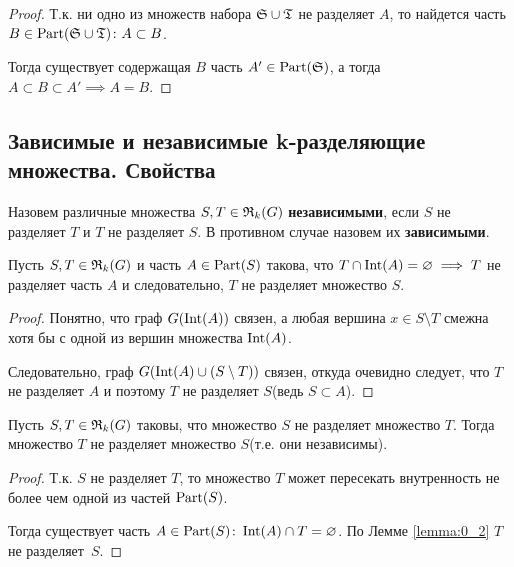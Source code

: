\begin{proof}
	Т.к. ни одно из множеств набора $\mathfrak{S} \cup \mathfrak{T}$ не разделяет  $A$, то найдется часть  $B \in \operatorname{Part}(\mathfrak{S} \cup \mathfrak{T}) \colon A \subset B$.

	Тогда существует содержащая  $B$ часть  $A' \in \operatorname{Part}(\mathfrak{S})$, а тогда  $A \subset B \subset A' \implies A = B$.
\end{proof}

\subsection{Зависимые и независимые k-разделяющие множества. Свойства}

\begin{df*}
	Назовем различные множества $S, T \in \mathfrak{R}_k(G)$ \textbf{независимыми}, если $S$ не разделяет $T$ и $T$ не разделяет $S$.
	В противном случае назовем их \textbf{зависимыми}.
\end{df*}

\begin{customlm}{0.2} \label{lemma:0_2}
	Пусть $S, T \in \mathfrak{R}_k(G)$ и часть  $A \in \operatorname{Part}(S)$ такова, что  $T \cap \operatorname{Int}(A) = \varnothing \implies T$ не разделяет часть  $A$ и следовательно,  $T$ не разделяет множество  $S$.
\end{customlm}

\begin{proof}
	Понятно, что граф $G(\operatorname{Int}(A))$ связен, а любая вершина  $x \in S \setminus T$ смежна хотя бы с одной из вершин множества  $\operatorname{Int}(A)$.

	Следовательно, граф  $G(\operatorname{Int}(A) \cup (S \setminus T))$ связен, откуда очевидно следует, что  $T$ не разделяет  $A$ и  поэтому $T$ не разделяет  $S$(ведь $S \subset A$).
\end{proof}

\begin{customlm}{0.3} \label{lemma:0_3}
	Пусть $S, T \in \mathfrak{R}_k(G)$ таковы, что множество  $S$ не разделяет множество $T$. Тогда множество $T$ не разделяет множество $S$(т.е. они независимы).
\end{customlm}

\begin{proof}
	Т.к. $S$ не разделяет $T$, то множество $T$ может пересекать внутренность не более чем одной из частей $\operatorname{Part}(S)$.

	Тогда существует часть  $A \in \operatorname{Part}(S) \colon \operatorname{Int}(A) \cap T = \varnothing$.
	По Лемме \ref{lemma:0_2} $T$ не разделяет~$S$.
\end{proof}


